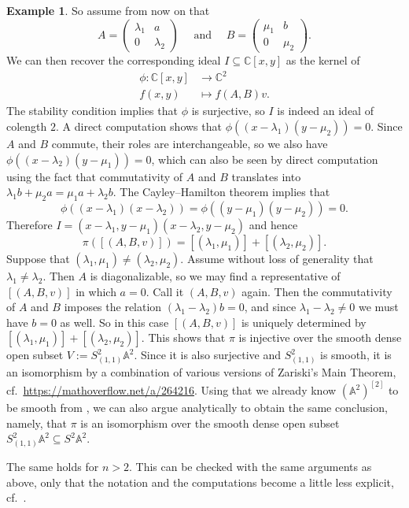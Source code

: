 \documentclass[12pt,a4paper]{amsart}
\theoremstyle{plain}
\theoremstyle{definition}
\newtheorem{exmp}[thm]{Example}
\theoremstyle{remark}
\begin{document}
\begin{exmp}
  So assume from now on that
  \[ A = \begin{pmatrix} \lambda_{1} & a \\
  0 & \lambda_{2} \end{pmatrix}
  \quad \text{ and } \quad B = \begin{pmatrix}
    \mu_{1} & b \\
    0 & \mu_{2} \end{pmatrix}.
  \]
  We can then recover the corresponding ideal $I \subseteq \mathbb{C}[x,y]$ as the kernel of
  \begin{align*}
    \phi \colon \mathbb{C}[x,y] & \longrightarrow \mathbb{C}^{2} \\
    f(x,y) & \longmapsto f(A,B)v.
  \end{align*}
  The stability condition implies that $\phi$ is surjective, so $I$ is indeed an ideal of colength $2$.
  A direct computation shows that $\phi((x-\lambda_{1})(y - \mu_{2}))= 0$.
  Since $A$ and $B$ commute, their roles are interchangeable, so we also have $\phi((x - \lambda_{2})(y - \mu_{1})) = 0$, which can also be seen by direct computation using the fact that commutativity of $A$ and $B$ translates into $\lambda_{1} b + \mu_{2} a = \mu_{1} a + \lambda_{2} b$.
  The Cayley--Hamilton theorem implies that
  \[ \phi((x - \lambda_{1})(x - \lambda_{2})) = \phi((y - \mu_{1})(y - \mu_{2})) = 0. \]
  Therefore $I = (x - \lambda_{1}, y - \mu_{1})(x - \lambda_{2}, y - \mu_{2})$ and hence
  \[ \pi([(A,B,v)]) = [(\lambda_{1}, \mu_{1})] + [(\lambda_{2}, \mu_{2})]. \]
  Suppose that $(\lambda_{1}, \mu_{1}) \neq (\lambda_{2}, \mu_{2})$.
  Assume without loss of generality that $\lambda_{1} \neq \lambda_{2}$.
  Then $A$ is diagonalizable, so we may find a representative of $[(A,B,v)]$ in which $a = 0$.
  Call it $(A,B,v)$ again.
  Then the commutativity of $A$ and $B$ imposes the relation $(\lambda_{1}-\lambda_{2})b = 0$, and since $\lambda_{1} - \lambda_{2} \neq 0$ we must have $b = 0$ as well.
  So in this case $[(A,B,v)]$ is uniquely determined by $[(\lambda_{1},\mu_{1})] + [(\lambda_{2}, \mu_{2})]$.
  This shows that $\pi$ is injective over the smooth dense open subset $V := S^{2}_{(1,1)}\mathbb{A}^{2}$.
  Since it is also surjective and $S^{2}_{(1,1)}$ is smooth, it is an isomorphism by a combination of various versions of Zariski's Main Theorem, cf.~\url{https://mathoverflow.net/a/264216}.
  Using that we already know $(\mathbb{A}^{2})^{[2]}$ to be smooth from \cite[Theorem 1.9]{nak99}, we can also argue analytically to obtain the same conclusion, namely, that $\pi$ is an isomorphism over the smooth dense open subset $S^{2}_{(1,1)}\mathbb{A}^{2} \subseteq S^{2}\mathbb{A}^{2}$.

  The same holds for $n > 2$.
  This can be checked with the same arguments as above, only that the notation and the computations become a little less explicit, cf.~\cite[Example 1.12.(4)]{nak99}.
\end{exmp}
\end{document}

